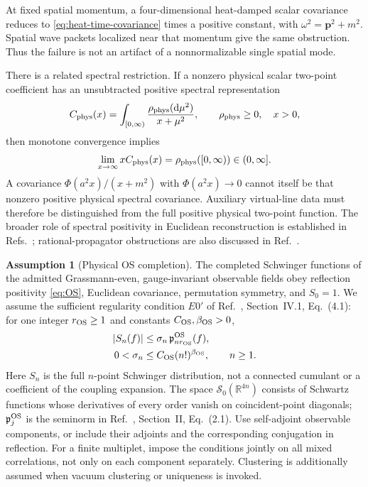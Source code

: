 \documentclass[final,5p,times,twocolumn,numbers,nopreprintline]{elsarticle}
\numberwithin{equation}{section}
\theoremstyle{definition}
\newtheorem{assumption}[theorem]{Assumption}
\theoremstyle{remark}
\newcommand{\dd}{\mathop{}\!\mathrm d}
\newcommand{\Ph}{\Phi}
\newcommand{\RR}{\mathbb R}
\begin{document}
At fixed spatial momentum, a four-dimensional heat-damped scalar
covariance reduces to \eqref{eq:heat-time-covariance} times a
positive constant, with
\(\omega^2=\mathbf p^2+m^2\).
Spatial wave packets localized near that momentum give the same
obstruction. Thus the failure is not an artifact of a nonnormalizable
single spatial mode.

There is a related spectral restriction. If a nonzero physical
scalar two-point coefficient has an unsubtracted positive spectral
representation
\begin{equation}
 C_{\rm phys}(x)=\int_{[0,\infty)}
          \frac{\rho_{\rm phys}(\dd\mu^2)}{x+\mu^2},
 \qquad \rho_{\rm phys}\geq0,\quad x>0,
 \label{eq:physical-spectral}
\end{equation}
then monotone convergence implies
\begin{equation}
 \lim_{x\to\infty}xC_{\rm phys}(x)
       =\rho_{\rm phys}([0,\infty))\in(0,\infty].
 \label{eq:spectral-obstruction}
\end{equation}
A covariance \(\Ph(a^2x)/(x+m^2)\) with
\(\Ph(a^2x)\to0\) cannot itself be that nonzero positive physical
spectral covariance. Auxiliary virtual-line data must therefore
be distinguished from the full positive physical two-point
function. The broader role of spectral positivity in Euclidean
reconstruction is established in
Refs.~\cite{OS1973,OS1975}; rational-propagator obstructions are
also discussed in Ref.~\cite{Arici2018}.

\begin{assumption}[Physical OS completion]
\label{ass:OS-completion}
The completed Schwinger functions of the admitted Grassmann-even,
gauge-invariant observable fields obey reflection positivity
\eqref{eq:OS}, Euclidean covariance, permutation symmetry, and
\(S_0=1\). We assume the sufficient regularity condition \(E0'\)
of Ref.~\cite{OS1975}, Section~IV.1, Eq.~(4.1): for one integer
\(r_{\rm OS}\geq1\) and constants \(C_{\rm OS},\beta_{\rm OS}>0\),
\begin{equation}
 \begin{aligned}
  |S_n(f)|&\leq\sigma_n\,\mathfrak p^{\rm OS}_{n r_{\rm OS}}(f),\\
  0<\sigma_n&\leq C_{\rm OS}(n!)^{\beta_{\rm OS}},\qquad n\geq1.
 \end{aligned}
 \label{eq:OS-hierarchy-growth}
\end{equation}
Here \(S_n\) is the full \(n\)-point Schwinger distribution,
not a connected cumulant or a coefficient of the coupling expansion.
The space \(\mathscr S_0(\RR^{4n})\) consists of Schwartz functions
whose derivatives of every order vanish on coincident-point diagonals;
\(\mathfrak p^{\rm OS}_j\) is the seminorm in Ref.~\cite{OS1975},
Section~II, Eq.~(2.1). Use self-adjoint observable components, or
include their adjoints and the corresponding conjugation in reflection.
For a finite multiplet, impose the conditions jointly on all mixed
correlations, not only on each component separately. Clustering is
additionally assumed when vacuum clustering or uniqueness is invoked.
\end{assumption}
\end{document}
